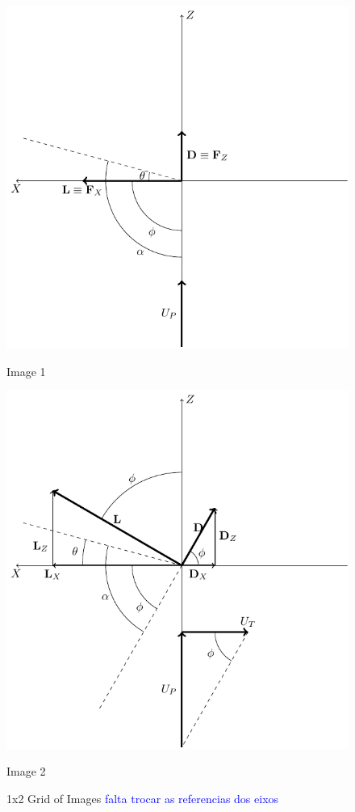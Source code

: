 \begin{figure}[!htb]
    \centering
    \begin{minipage}{0.45\textwidth}
        \centering
        \includegraphics[width=\linewidth]{Figures/implementation/bet/blade_forces/blade_element_forces_5.pdf} %
        \caption{Image 1}
    \end{minipage}
    \hfill
    \begin{minipage}{0.45\textwidth}
        \centering
        \includegraphics[width=\linewidth]{Figures/implementation/bet/blade_forces/blade_element_forces_6.pdf} %
        \caption{Image 2}
    \end{minipage}
    \caption{1x2 Grid of Images \textcolor{blue}{falta trocar as referencias dos eixos}}
\end{figure}

